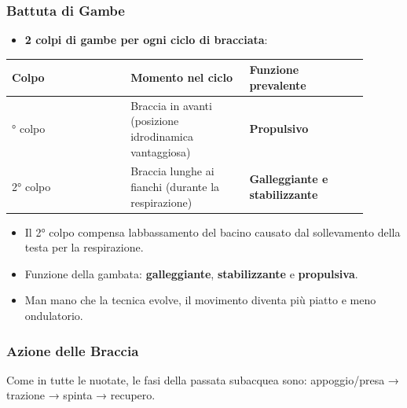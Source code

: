 \documentclass[a4paper,11pt]{article}
\providecommand{\tightlist}{%
  \setlength{\itemsep}{0pt}\setlength{\parskip}{0pt}}
\begin{document}
\subsubsection{Battuta di Gambe}\label{battuta-di-gambe-2}

\begin{itemize}
      \tightlist
      \item
            \textbf{2 colpi di gambe per ogni ciclo di bracciata}:
\end{itemize}

\begin{longtable}[]{@{}p{0.30\linewidth}p{0.30\linewidth}p{0.30\linewidth}@{}}
      \toprule\noalign{}
      Colpo    & Momento nel ciclo                                      & Funzione prevalente \\
      \midrule\noalign{}
      \endhead
      \bottomrule\noalign{}
      \endlastfoot
      1° colpo & Braccia in avanti (posizione idrodinamica vantaggiosa) &
      \textbf{Propulsivo}                                                                     \\
      2° colpo & Braccia lunghe ai fianchi (durante la respirazione)    &
      \textbf{Galleggiante e stabilizzante}                                                   \\
\end{longtable}

\begin{itemize}
      \tightlist
      \item
            Il 2° colpo compensa l\textquotesingle abbassamento del bacino causato
            dal sollevamento della testa per la respirazione.
      \item
            Funzione della gambata: \textbf{galleggiante}, \textbf{stabilizzante}
            e \textbf{propulsiva}.
      \item
            Man mano che la tecnica evolve, il movimento diventa più piatto e meno
            ondulatorio.
\end{itemize}

\subsubsection{Azione delle Braccia}\label{azione-delle-braccia-3}

Come in tutte le nuotate, le fasi della passata subacquea sono:
appoggio/presa → trazione → spinta → recupero.
\end{document}
